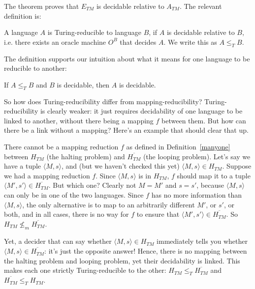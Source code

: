 The theorem proves that $E_{TM}$ is decidable relative to
$A_{TM}$. The relevant definition is:

\begin{definition}
A language $A$ is Turing-reducible to language $B$, if $A$
is decidable relative to $B$, i.e. there exists an oracle machine
$O^B$ that decides $A$. We write this as $A \leq_T B$.
\end{definition}

The definition supports our intuition about what it means for one
language to be reducible to another:

\begin{theorem}
If $A \leq_T B$ and $B$ is decidable, then $A$ is decidable.
\end{theorem}

So how does Turing-reducibility differ from mapping-reducibility? Turing-reducibility is clearly weaker: it just requires decidability of one language to be linked to another, without there being a mapping $f$ between them. But how can there be a link without a mapping? Here's an example that should clear that up.

\begin{example}
There cannot be a mapping reduction $f$ as defined in Definition~\ref{manyone} between $H_{TM}$ (the halting problem) and $\overline{H_{TM}}$ (the looping problem). Let's say we have a tuple $\langle M,s\rangle$, and (but we haven't checked this yet) $\langle M,s\rangle\in H_{TM}$. Suppose we had a mapping reduction $f$. Since $\langle M,s\rangle$ is in $H_{TM}$, $f$ should map it to a tuple $\langle M',s'\rangle \in \overline{H_{TM}}$. But which one? Clearly not $M = M'$ and $s = s'$, because $\langle M,s\rangle$ can only be in one of the two languages. Since $f$ has no more information than $\langle M,s\rangle$, the only alternative is to map to an arbitrarily different $M'$, or $s'$, or both, and in all cases, there is no way for $f$ to ensure that $\langle M',s'\rangle \in \overline{H_{TM}}$. So $H_{TM} \not\leq_m \overline{H_{TM}}$.

Yet, a decider that can say whether $\langle M,s\rangle \in H_{TM}$ immediately tells you whether $\langle M,s\rangle \in \overline{H_{TM}}$: it's just the opposite answer! Hence, there is no mapping between the halting problem and looping problem, yet their decidability is linked. This makes each one strictly Turing-reducible to the other: $H_{TM} \leq_T \overline{H_{TM}}$ and $\overline{H_{TM}} \leq_T H_{TM}$.
\end{example}

